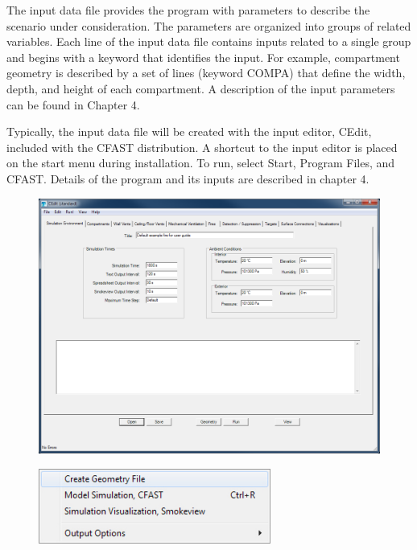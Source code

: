 The input data file provides the program with parameters to describe the scenario under consideration. The parameters are organized into groups of related variables. Each line of the input data file contains inputs related to a single group and begins with a keyword that identifies the input.  For example, compartment geometry is described by a set of lines (keyword COMPA) that define the width, depth, and height of each compartment.  A description of the input parameters can be found in Chapter 4.

Typically, the input data file will be created with the input editor, CEdit, included with the CFAST distribution. A shortcut to the input editor is placed on the start menu during installation.  To run, select Start, Program Files, and CFAST. Details of the program and its inputs are described in chapter 4.

\begin{figure}[h!]
\begin{center}
\includegraphics[width=6.5in]{FIGURES/Running_CFAST/Environment_Tab}
\end{center}
\end{figure}

\begin{figure}
  \includegraphics[width=3in]{FIGURES/Running_CFAST/Run_Menu}
\end{figure}

